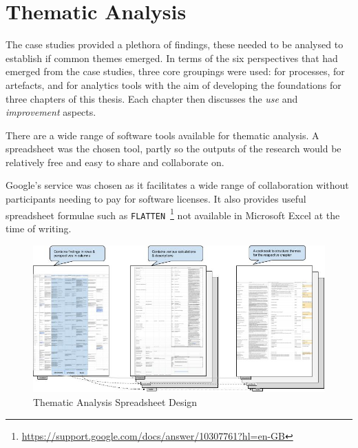 \chapter{Thematic Analysis}
\label{appendix-thematic-analysis}

The case studies provided a plethora of findings, these needed to be analysed to establish if common themes emerged. In terms of the six perspectives that had emerged from the case studies, three core groupings were used: for processes, for artefacts, and for analytics tools with the aim of developing the foundations for three chapters of this thesis. Each chapter then discusses the \textit{use} and \textit{improvement} aspects.

There are a wide range of software tools available for thematic analysis. A spreadsheet was the chosen tool, partly so the outputs of the research would be relatively free and easy to share and collaborate on. %

Google's service was chosen as it facilitates a wide range of collaboration without participants needing to pay for software licenses. It also provides useful spreadsheet formulae such as \texttt{FLATTEN}~\footnote{\url{https://support.google.com/docs/answer/10307761?hl=en-GB}} not available in Microsoft Excel at the time of writing.

\begin{figure}
    \centering
    \includegraphics[width=\textwidth]{images/my/Thematic-Analysis-Spreadsheet-Design-28-may-2022a.jpeg}
    \caption{Thematic Analysis Spreadsheet Design}
    \label{fig:thematic-analysis-spreadsheet-design}
\end{figure}

